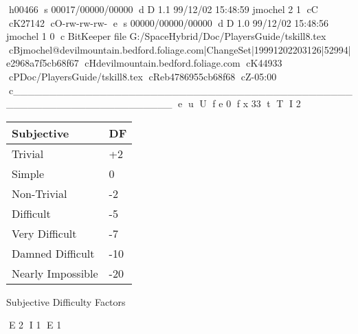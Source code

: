 h00466
s 00017/00000/00000
d D 1.1 99/12/02 15:48:59 jmochel 2 1
cC
cK27142
cO-rw-rw-rw-
e
s 00000/00000/00000
d D 1.0 99/12/02 15:48:56 jmochel 1 0
c BitKeeper file G:/SpaceHybrid/Doc/PlayersGuide/tskill8.tex
cBjmochel@devilmountain.bedford.foliage.com|ChangeSet|19991202203126|52994|e2968a7f5cb68f67
cHdevilmountain.bedford.foliage.com
cK44933
cPDoc/PlayersGuide/tskill8.tex
cReb4786955cb68f68
cZ-05:00
c______________________________________________________________________
e
u
U
f e 0
f x 33
t
T
I 2


\begin{SHTable}[h]
	\begin{tabular}{l|l}
	Subjective						& DF \\
	\hline
    Trivial			& +2 \\
	Simple			&  0 \\
	Non-Trivial	 	&  -2 \\
	Difficult		&  -5 \\
	Very Difficult  & -7 \\ 
	Damned Difficult & -10 \\
   	Nearly Impossible & -20 \\
	\end{tabular}
    \caption{Subjective Difficulty Factors}\label{Table:SubjectiveDFs}
\end{SHTable}

E 2
I 1
E 1
